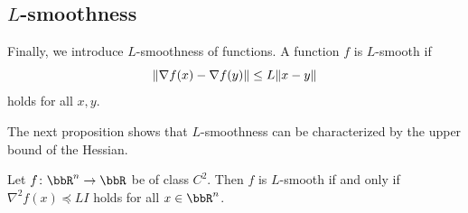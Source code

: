 \documentclass[en]{subfiles}
\begin{document}
\subsection{$L$-smoothness}

Finally, we introduce $L$-smoothness of functions.
A function $f$ is $L$-smooth if
\begin{equation}\label{eq:def_LSmooth}
    \norm{\nabla f(x)-\nabla f(y)} \le L\norm{x-y}
\end{equation}
holds for all $x,y$.

The next proposition shows that $L$-smoothness can be characterized by the upper bound of the Hessian.
\begin{proposition}\label{prop:smoothness-hessian}
    Let $f \colon \bbR^n \to \bbR$ be of class $C^2$. Then $f$ is $L$-smooth if and only if $\nabla^2 f(x)\preceq L I$ holds for all $x \in \bbR^n$.
\end{proposition}
\end{document}
